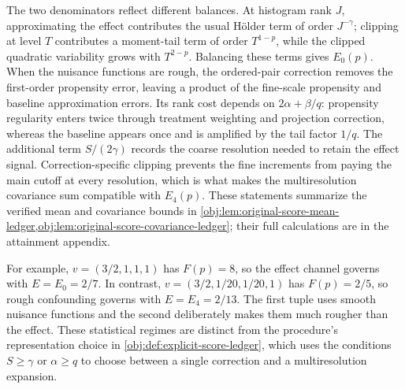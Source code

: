 \documentclass[11pt]{article}
\begin{document}
The two denominators reflect different balances. At histogram rank \(J\), approximating the effect contributes the usual Hölder term of order \(J^{-\gamma}\); clipping at level \(T\) contributes a moment-tail term of order \(T^{1-p}\), while the clipped quadratic variability grows with \(T^{2-p}\). Balancing these terms gives \(E_0(p)\). When the nuisance functions are rough, the ordered-pair correction removes the first-order propensity error, leaving a product of the fine-scale propensity and baseline approximation errors. Its rank cost depends on \(2\alpha+\beta/q\): propensity regularity enters twice through treatment weighting and projection correction, whereas the baseline appears once and is amplified by the tail factor \(1/q\). The additional term \(S/(2\gamma)\) records the coarse resolution needed to retain the effect signal. Correction-specific clipping prevents the fine increments from paying the main cutoff at every resolution, which is what makes the multiresolution covariance sum compatible with \(E_4(p)\). These statements summarize the verified mean and covariance bounds in \cref{obj:lem:original-score-mean-ledger,obj:lem:original-score-covariance-ledger}; their full calculations are in the attainment appendix.

For example, \(v=(3/2,1,1,1)\) has \(F(p)=8\), so the effect channel governs with \(E=E_0=2/7\). In contrast, \(v=(3/2,1/20,1/20,1)\) has \(F(p)=2/5\), so rough confounding governs with \(E=E_4=2/13\). The first tuple uses smooth nuisance functions and the second deliberately makes them much rougher than the effect. These statistical regimes are distinct from the procedure's representation choice in \cref{obj:def:explicit-score-ledger}, which uses the conditions \(S\ge\gamma\) or \(\alpha\ge q\) to choose between a single correction and a multiresolution expansion.
\end{document}
